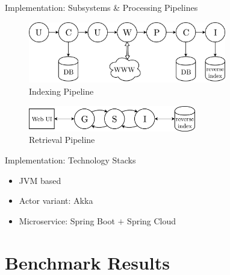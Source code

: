 \documentclass{beamer}
\begin{document}
\begin{frame}{Implementation: Subsystems \& Processing Pipelines}

\begin{figure} 
  \includegraphics[width=0.77\textwidth]{graphics/pipeline-indexing.png} 
  \caption{Indexing Pipeline}
\end{figure}

\begin{figure} 
  \includegraphics[width=0.65\textwidth]{graphics/pipeline-retrieval.png} 
  \caption{Retrieval Pipeline}
\end{figure}

\end{frame}


\begin{frame}{Implementation: Technology Stacks}

\begin{itemize}
  \item JVM based
  \item Actor variant: Akka
  \item Microservice: Spring Boot $+$ Spring Cloud
\end{itemize}

\end{frame}


\section{Benchmark Results}

\end{document}
